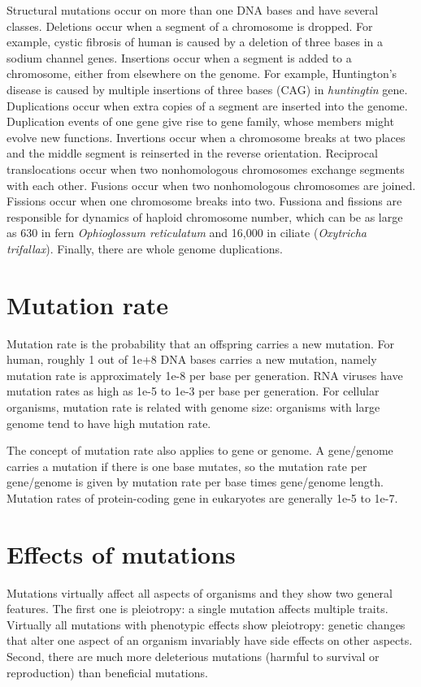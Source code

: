 \documentclass[11pt]{article}
\begin{document}
\begin{sloppypar}
Structural mutations occur on more than one DNA bases and have several classes. 
Deletions occur when a segment of a chromosome is dropped. 
For example, cystic fibrosis of human is caused by a deletion of three bases in a sodium channel genes. 
Insertions occur when a segment is added to a chromosome, either from elsewhere on the genome. 
For example, Huntington's disease is caused by multiple insertions of three bases (CAG) in \textit{huntingtin} gene. 
Duplications occur when extra copies of a segment are inserted into the genome. 
Duplication events of one gene give rise to gene family, whose members might evolve new functions. 
Invertions occur when a chromosome breaks at two places and the middle segment is reinserted in the reverse orientation. 
Reciprocal translocations occur when two nonhomologous chromosomes exchange segments with each other. 
Fusions occur when two nonhomologous chromosomes are joined. 
Fissions occur when one chromosome breaks into two. 
Fussiona and fissions are responsible for dynamics of haploid chromosome number, which can be as large as 630 in fern \textit{Ophioglossum reticulatum} and 16,000 in ciliate (\textit{Oxytricha trifallax}). 
Finally, there are whole genome duplications. 

\section{Mutation rate}
Mutation rate is the probability that an offspring carries a new mutation. 
For human, roughly 1 out of 1e+8 DNA bases carries a new mutation, namely mutation rate is approximately 1e-8 per base per generation. 
RNA viruses have mutation rates as high as 1e-5 to 1e-3 per base per generation.  
For cellular organisms, mutation rate is related with genome size: organisms with large genome tend to have high mutation rate. 

\par

The concept of mutation rate also applies to gene or genome. 
A gene/genome carries a mutation if there is one base mutates, so the mutation rate per gene/genome is given by mutation rate per base times gene/genome length. 
Mutation rates of protein-coding gene in eukaryotes are generally 1e-5 to 1e-7. 

\section{Effects of mutations}
Mutations virtually affect all aspects of organisms and they show two general features. 
The first one is pleiotropy: a single mutation affects multiple traits. 
Virtually all mutations with phenotypic effects show pleiotropy: genetic changes that alter one aspect of an organism invariably have side effects on other aspects. 
Second, there are much more deleterious mutations (harmful to survival or reproduction) than beneficial mutations. 


\end{sloppypar}
\end{document}
